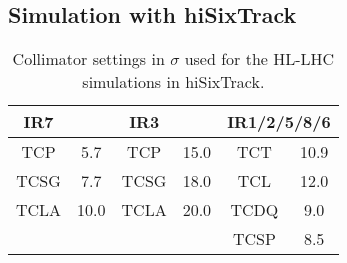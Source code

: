 






\subsection{Simulation with hiSixTrack}

\begin{table}[htbp]
\centering
\caption{Collimator settings in $\sigma$ used for the HL-LHC simulations in hiSixTrack.}
\label{tab:sets_hl}
\begin{tabular}{cccccc} 
\toprule
IR7    &       &   IR3   &          &    \multicolumn{2}{c}{IR1/2/5/8/6} \\ \midrule
TCP    &  5.7  &   TCP   &  15.0    &    TCT  &   10.9 \\ 
TCSG   &  7.7  &   TCSG  &  18.0    &    TCL  &   12.0 \\
TCLA   & 10.0  &   TCLA  &  20.0    &   TCDQ  &   9.0  \\ 
       &       &         &          &   TCSP  &   8.5  \\ \bottomrule
\end{tabular}
\end{table}

